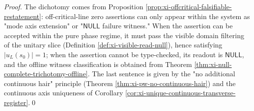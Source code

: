 \begin{proof}
The dichotomy comes from Proposition \ref{prop:xi-offcritical-falsifiable-restatement}: off-critical-line zero assertions can only appear within the system as "mode axis extension" or "\(\mathsf{NULL}\) failure witness."
When the assertion can be accepted within the pure phase regime, it must pass the visible domain filtering of the unitary slice (Definition \ref{def:xi-visible-read-null}), hence satisfying \(|u_L(s_0)|=1\); when the assertion cannot be type-checked, its readout is \(\mathsf{NULL}\), and the offline witness classification is obtained from Theorem \ref{thm:xi-null-complete-trichotomy-offline}.
The last sentence is given by the "no additional continuous hair" principle (Theorem \ref{thm:xi-pw-no-continuous-hair}) and the continuous axis uniqueness of Corollary \ref{cor:xi-unique-continuous-transverse-register}.\qed
\end{proof}

